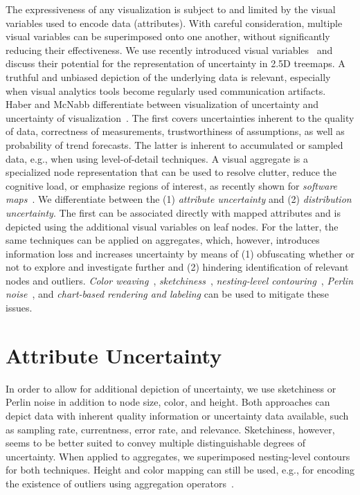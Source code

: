 \documentclass[sigconf]{acmart}
\begin{document}
\noindent
The expressiveness of any visualization is subject to and limited by the visual variables used to encode data (attributes).
With careful consideration, multiple visual variables can be superimposed onto one another, without significantly reducing their effectiveness.
We use recently introduced visual variables~\cite{limberger2019-advanced} and discuss their potential for the representation of uncertainty in 2.5D treemaps. %
A truthful and unbiased depiction of the underlying data is relevant, especially when visual analytics tools become regularly used communication artifacts. %
Haber and McNabb differentiate between visualization of uncertainty and uncertainty of visualization~\cite{Haber1990}. 
The first covers uncertainties inherent to the quality of data, correctness of measurements, trustworthiness of assumptions, as well as probability of trend forecasts.
The latter is inherent to accumulated or sampled data, e.g., when using level-of-detail techniques.
A visual aggregate is a specialized node representation that can be used to resolve clutter, reduce the cognitive load, or emphasize regions of interest, as recently shown for \emph{software maps}~\cite{limberger2017-aggregation}. %
We differentiate between the (1) \emph{attribute uncertainty} and (2) \emph{distribution uncertainty}.
The first can be associated directly with mapped attributes and is depicted using the additional visual variables on leaf nodes.
For the latter, the same techniques can be applied on aggregates, 
which, however, introduces information loss and increases uncertainty by means of (1) obfuscating whether or not to explore and investigate further and (2) hindering identification of relevant nodes and outliers.
\emph{Color weaving}~\cite{Hagh-Shenas2007}, \emph{sketchiness}~\cite{Boukhelifa2012,limberger2016-sketchy}, \emph{nesting-level contouring}~\cite{limberger2017-aggregation}, \emph{Perlin noise}~\cite{Djurcilov2002,Coninx2011}, and \emph{chart-based rendering and labeling} can be used to mitigate these issues.

\section{Attribute Uncertainty}

In order to allow for additional depiction of uncertainty, %
we use sketchiness \cite{Boukhelifa2012,limberger2016-sketchy} or Perlin noise \cite{Djurcilov2002,Coninx2011} in addition to node size, color, and height.
Both approaches can depict data with inherent quality information or uncertainty data available, such as sampling rate, currentness, error rate, and relevance.
Sketchiness, however, seems to be better suited to convey multiple distinguishable degrees of uncertainty. %
When applied to aggregates, %
we superimposed nesting-level contours for both techniques.
Height and color mapping can still be used, e.g., for encoding the existence of outliers using aggregation operators~\cite{limberger2017-aggregation}. %
\end{document}
